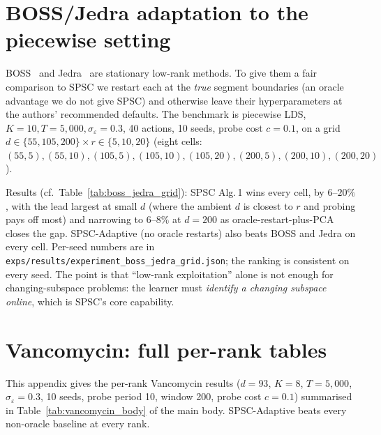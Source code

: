 \documentclass{article}
\begin{document}
\section{BOSS/Jedra adaptation to the piecewise setting}
\label{app:boss_jedra_detail}

BOSS~\citep{duong2024beyond} and Jedra~\citep{jedra2024low} are
stationary low-rank methods. To give them a fair comparison to SPSC
we restart each at the \emph{true} segment boundaries (an oracle
advantage we do not give SPSC) and otherwise leave their
hyperparameters at the authors' recommended defaults. The benchmark
is piecewise LDS, $K{=}10, T{=}5{,}000, \sigma_\varepsilon{=}0.3$, 40
actions, 10 seeds, probe cost $c{=}0.1$, on a grid
$d\in\{55,105,200\}\times r\in\{5,10,20\}$ (eight cells:
$(55,5),(55,10),(105,5),(105,10),(105,20),(200,5),(200,10),(200,20)$).

Results (cf.\ Table~\ref{tab:boss_jedra_grid}): SPSC Alg.\,1 wins
every cell, by $6$--$20\%$, with the lead largest at small $d$ (where
the ambient $d$ is closest to $r$ and probing pays off most) and
narrowing to $6$--$8\%$ at $d{=}200$ as oracle-restart-plus-PCA
closes the gap. SPSC-Adaptive (no oracle restarts) also beats BOSS
and Jedra on every cell. Per-seed numbers are in
\texttt{exps/results/experiment\_boss\_jedra\_grid.json}; the ranking
is consistent on every seed. The point is that ``low-rank
exploitation'' alone is not enough for changing-subspace
problems: the learner must \emph{identify a changing subspace
online}, which is SPSC's core capability.

\section{Vancomycin: full per-rank tables}
\label{app:vancomycin_full}

This appendix gives the per-rank Vancomycin results
($d{=}93$, $K{=}8$, $T{=}5{,}000$, $\sigma_\varepsilon{=}0.3$, 10
seeds, probe period 10, window 200, probe cost $c{=}0.1$) summarised
in Table~\ref{tab:vancomycin_body} of the main body. SPSC-Adaptive
beats every non-oracle baseline at every rank.
\end{document}
